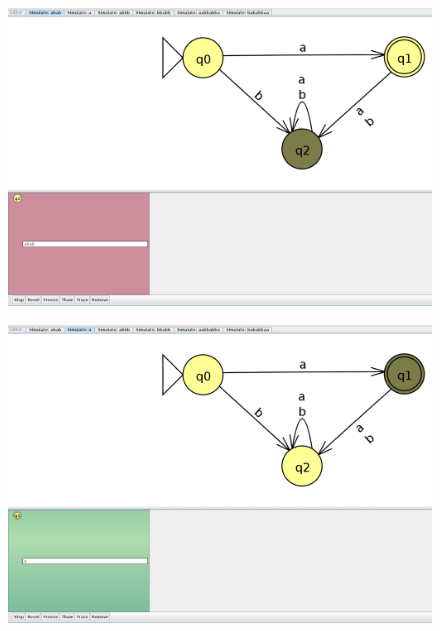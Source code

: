\documentclass[11pt]{article}
\begin{document}
\begin{figure}[]
\centering
\includegraphics[scale=0.2]{images/Cadena1.png}
\label{}
\\
\end{figure}

\begin{figure}[]
\centering
\includegraphics[scale=0.2]{images/Cadena2.png}
\label{}
\\
\end{figure}
\end{document}
